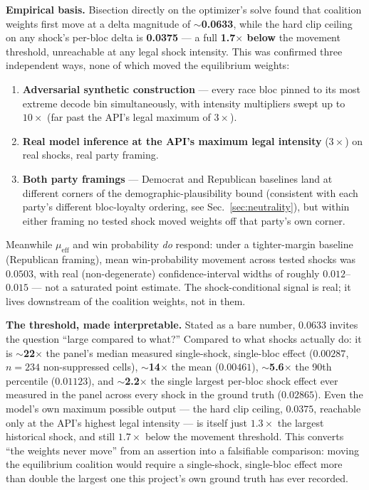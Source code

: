 \documentclass[11pt]{article}
\begin{document}
\textbf{Empirical basis.} Bisection directly on the optimizer's solve found
that coalition weights first move at a delta magnitude of
\textbf{$\sim$0.0633}, while the hard clip ceiling on any shock's per-bloc
delta is \textbf{0.0375} --- a full \textbf{1.7$\times$ below} the movement
threshold, unreachable at any legal shock intensity. This was confirmed
three independent ways, none of which moved the equilibrium weights:
\begin{enumerate}
  \item \textbf{Adversarial synthetic construction} --- every race bloc
        pinned to its most extreme decode bin simultaneously, with intensity
        multipliers swept up to $10\times$ (far past the API's legal
        maximum of $3\times$).
  \item \textbf{Real model inference at the API's maximum legal intensity}
        ($3\times$) on real shocks, real party framing.
  \item \textbf{Both party framings} --- Democrat and Republican baselines
        land at different corners of the demographic-plausibility bound
        (consistent with each party's different bloc-loyalty ordering, see
        Sec.~\ref{sec:neutrality}), but within either framing no tested
        shock moved weights off that party's own corner.
\end{enumerate}
Meanwhile $\mu_{\text{eff}}$ and win probability \emph{do} respond: under a
tighter-margin baseline (Republican framing), mean win-probability movement
across tested shocks was $0.0503$, with real (non-degenerate)
confidence-interval widths of roughly $0.012$--$0.015$ --- not a saturated
point estimate. The shock-conditional signal is real; it lives downstream of
the coalition weights, not in them.

\textbf{The threshold, made interpretable.} Stated as a bare number, 0.0633
invites the question ``large compared to what?'' Compared to what shocks
actually do: it is \textbf{$\sim$22$\times$} the panel's median measured
single-shock, single-bloc effect ($0.00287$, $n{=}234$ non-suppressed cells),
\textbf{$\sim$14$\times$} the mean ($0.00461$), \textbf{$\sim$5.6$\times$}
the 90th percentile ($0.01123$), and \textbf{$\sim$2.2$\times$} the single
largest per-bloc shock effect ever measured in the panel across every shock
in the ground truth ($0.02865$). Even the model's own maximum possible
output --- the hard clip ceiling, $0.0375$, reachable only at the API's
highest legal intensity --- is itself just $1.3\times$ the largest historical
shock, and still $1.7\times$ below the movement threshold. This converts
``the weights never move'' from an assertion into a falsifiable comparison:
moving the equilibrium coalition would require a single-shock, single-bloc
effect more than double the largest one this project's own ground truth has
ever recorded.
\end{document}
